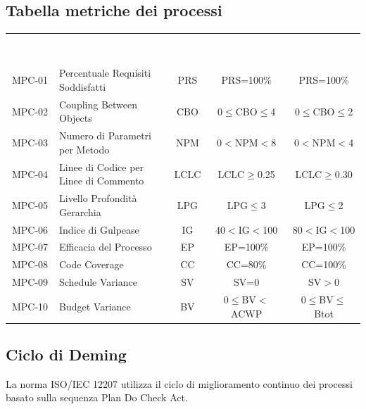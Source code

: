 \newpage
\subsection{Tabella metriche dei processi}
    \renewcommand{\arraystretch}{1.5}
    \begin{longtable}{ c C{4cm} c c c}
    \textcolor{white}{\textbf{Metrica}} & \textcolor{white}{\textbf{Nome}} & \textcolor{white}{\textbf{Sigla}} & \textcolor{white}{\textbf{Valore Accettabile}} & \textcolor{white}{\textbf{Valore Ottimale}}\\
    MPC-01 & Percentuale Requisiti Soddisfatti & PRS & PRS=100\% & PRS=100\% \\
    MPC-02 & Coupling Between Objects & CBO & 0$\leq$CBO$\leq$4 & 0$\leq$CBO$\leq$2 \\
    MPC-03 & Numero di Parametri per Metodo & NPM & 0$<$NPM$<$8 & 0$<$NPM$<$4 \\
    MPC-04 & Linee di Codice per Linee di Commento & LCLC & LCLC$\geq$0.25 & LCLC$\geq$0.30 \\
    MPC-05 & Livello Profondità Gerarchia & LPG & LPG$\leq$3 & LPG$\leq$2\\
    MPC-06 & Indice di Gulpease & IG & 40$<$IG$<$100 & 80$<$IG$<$100 \\
    MPC-07 & Efficacia del Processo & EP & EP=100\% & EP=100\%  \\
    MPC-08 & Code Coverage & CC & CC=80\% & CC=100\%  \\
    MPC-09 & Schedule Variance & SV & SV=0 & SV$>$0  \\	
    MPC-10 & Budget Variance & BV & 0$\leq$BV$<$ACWP  & 0$\leq$BV$\leq$Btot  \\	

    \end{longtable}

\subsection{Ciclo di Deming}
    La norma ISO/IEC 12207 utilizza il ciclo di miglioramento continuo dei processi basato sulla sequenza Plan Do Check Act.


